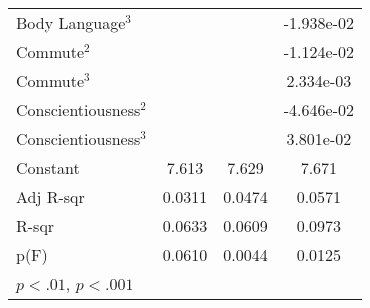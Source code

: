 {\begin{tabular}{l*{3}{c}}
    \addlinespace
    Body Language$^3$     &                             &                             & -1.938e-02                  \\
    \addlinespace
    Commute$^2$           &                             &                             & -1.124e-02                  \\
    \addlinespace
    Commute$^3$           &                             &                             & 2.334e-03                   \\
    \addlinespace
    Conscientiousness$^2$ &                             &                             & -4.646e-02                  \\
    \addlinespace
    Conscientiousness$^3$ &                             &                             & 3.801e-02                   \\
    \addlinespace
    Constant              & 7.613\sym{**}               & 7.629\sym{**}               & 7.671\sym{**}               \\
    \midrule
    Adj R-sqr             & 0.0311                      & 0.0474                      & 0.0571                      \\
    R-sqr                 & 0.0633                      & 0.0609                      & 0.0973                      \\
    p(F)                  & 0.0610                      & 0.0044                      & 0.0125                      \\
    \bottomrule
    \multicolumn{4}{l}{\footnotesize \sym{*} \(p<.01\), \sym{**} \(p<.001\)}                                        \\
\end{tabular}
}

